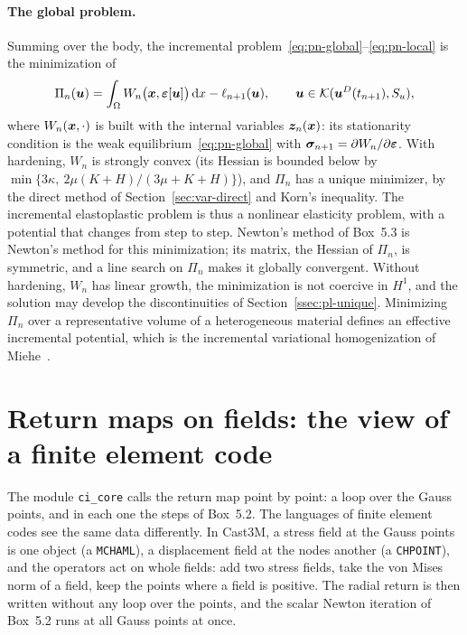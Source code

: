 \paragraph{The global problem.}
%
Summing over the body, the incremental problem~\eqref{eq:pn-global}--\eqref{eq:pn-local}
is the minimization of
\begin{equation}\label{eq:pn-Pi}
  \Pi_n(\bm{u})=\int_\Omega W_n\bigl(\bm{x},\bm{\varepsilon}[\bm{u}]\bigr)\,\mathrm{d} x-\ell_{n+1}(\bm{u}),
  \qquad \bm{u}\in\mathcal{K}(\bm{u}^{D}(t_{n+1}),S_u),
\end{equation}
where $W_n(\bm{x},\cdot)$ is built with the internal variables $\bm{z}_n(\bm{x})$: its
stationarity condition is the weak equilibrium~\eqref{eq:pn-global} with
$\bm{\sigma}_{n+1}=\partial W_n/\partial\bm{\varepsilon}$. With hardening, $W_n$ is strongly convex
(its Hessian is bounded below by
$\min\{3\kappa,\ 2\mu(K+H)/(3\mu+K+H)\}$), and $\Pi_n$ has a unique minimizer, by
the direct method of Section~\ref{sec:var-direct} and Korn's inequality. The
incremental elastoplastic problem is thus a nonlinear elasticity problem, with
a potential that changes from step to step. Newton's method of Box~5.3 is
Newton's method for this minimization; its matrix, the Hessian of $\Pi_n$, is
symmetric, and a line search on $\Pi_n$ makes it globally convergent. Without
hardening, $W_n$ has linear growth, the minimization is not coercive in $H^1$,
and the solution may develop the discontinuities of
Section~\ref{ssec:pl-unique}. Minimizing $\Pi_n$ over a representative volume
of a heterogeneous material defines an effective incremental potential, which
is the incremental variational homogenization of Miehe~\cite{Miehe2002}.

\section{Return maps on fields: the view of a finite element code}\label{sec:pn-fields}
%
The module \texttt{ci\_core} calls the return map point by point: a loop over
the Gauss points, and in each one the steps of Box~5.2. The languages of
finite element codes see the same data differently. In Cast3M, a stress field
at the Gauss points is one object (a \texttt{MCHAML}), a displacement field at
the nodes another (a \texttt{CHPOINT}), and the operators act on whole fields:
add two stress fields, take the von Mises norm of a field, keep the points
where a field is positive. The radial return is then written without any loop
over the points, and the scalar Newton iteration of Box~5.2 runs at all Gauss
points at once.

